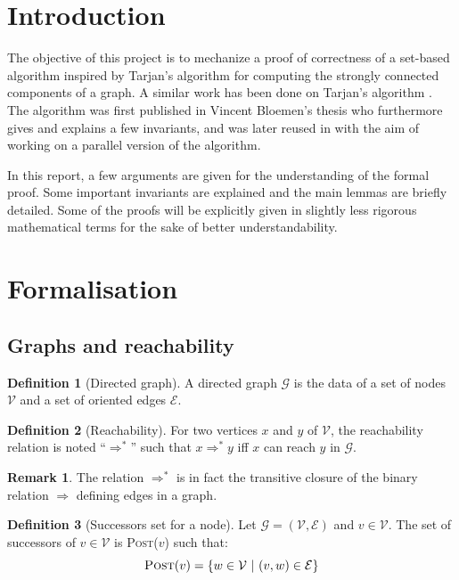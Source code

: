 \documentclass[a4 paper, 12pt]{article}
\theoremstyle{definition}
\def\GG{\ensuremath{\mathcal{G}}}
\def\VV{\ensuremath{\mathcal{V}}}
\def\EE{\ensuremath{\mathcal{E}}}
\newtheorem{definition}{Definition}
\newtheorem{remark}{Remark}
\begin{document}
\section{Introduction}

The objective of this project is to mechanize a proof of correctness of a set-based algorithm inspired by Tarjan's algorithm \cite{TarjanDFS} for computing the strongly connected components of a graph. A similar work has been done on Tarjan's algorithm \cite{TarjanMerz}. The algorithm was first published in Vincent Bloemen's thesis \cite{bloemen_strong_2019} who furthermore gives and explains a few invariants, and was later reused in \cite{bloemen_multi-core_2016} with the aim of working on a parallel version of the algorithm.

In this report, a few arguments are given for the understanding of the formal proof. Some important invariants are explained and the main lemmas are briefly detailed. Some of the proofs will be explicitly given in slightly less rigorous mathematical terms for the sake of better understandability.

\section{Formalisation}
\subsection{Graphs and reachability}
\begin{definition}[Directed graph]
    A directed graph \GG\xspace is the data of a set of nodes \VV\xspace and a set of oriented edges \EE.
\end{definition}

\begin{definition}[Reachability]
    For two vertices $x$ and $y$ of \VV, the reachability relation is noted ``$\Rightarrow^*$'' such that $x \Rightarrow^* y$ iff $x$ can reach $y$ in \GG.
\end{definition}

\begin{remark}
    The relation $\Rightarrow^*$ is in fact the transitive closure of the binary relation $\Rightarrow$ defining edges in a graph.
\end{remark}

\begin{definition}[Successors set for a node]
    Let $\mathcal{G} = (\mathcal{V}, \mathcal{E})$ and $v \in \mathcal{V}$. The set of successors of $v \in \VV$ is \textsc{Post}($v$) such that:
    \begin{equation*}
        \textsc{Post}(v) = \{w \in \VV~|~(v,w) \in \mathcal{E}\}
    \end{equation*}
\end{definition}
\end{document}
